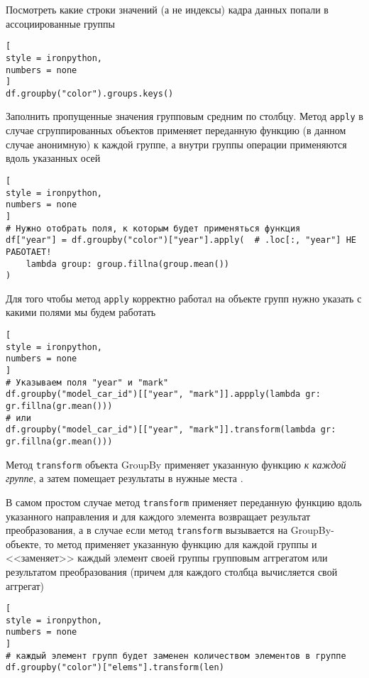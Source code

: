 \documentclass[%
	11pt,
	a4paper,
	utf8,
		]{article}
\begin{document}
Посмотреть какие строки значений (а не индексы) кадра данных попали в ассоциированные группы
\begin{lstlisting}[
style = ironpython,
numbers = none
]
df.groupby("color").groups.keys()
\end{lstlisting}

Заполнить пропущенные значения групповым средним по столбцу. Метод \verb|apply| в случае сгруппированных объектов применяет переданную функцию (в данном случае анонимную) к каждой группе, а внутри группы операции применяются вдоль указанных осей
\begin{lstlisting}[
style = ironpython,
numbers = none
]
# Нужно отобрать поля, к которым будет применяться функция
df["year"] = df.groupby("color")["year"].apply(  # .loc[:, "year"] НЕ РАБОТАЕТ!
    lambda group: group.fillna(group.mean())
)
\end{lstlisting}

Для того чтобы метод \verb|apply| корректно работал на объекте групп нужно указать с какими полями мы будем работать
\begin{lstlisting}[
style = ironpython,
numbers = none
]
# Указываем поля "year" и "mark"
df.groupby("model_car_id")[["year", "mark"]].appply(lambda gr: gr.fillna(gr.mean()))
# или
df.groupby("model_car_id")[["year", "mark"]].transform(lambda gr: gr.fillna(gr.mean()))
\end{lstlisting}

Метод \verb|transform| объекта GroupBy применяет указанную функцию \emph{к каждой группе}, а затем помещает результаты в нужные места \cite[]{mckinney:pandas-2015}.

В самом простом случае метод \texttt{transform} применяет переданную функцию вдоль указанного направления и для каждого элемента возвращает результат преобразования, а в случае если метод \verb|transform| вызывается на GroupBy-объекте, то метод применяет указанную функцию для каждой группы и <<заменяет>> каждый элемент своей группы групповым аггрегатом или результатом преобразования (причем для каждого столбца вычисляется свой аггрегат)
\begin{lstlisting}[
style = ironpython,
numbers = none
]
# каждый элемент групп будет заменен количеством элементов в группе
df.groupby("color")["elems"].transform(len)
\end{lstlisting}
\end{document}
